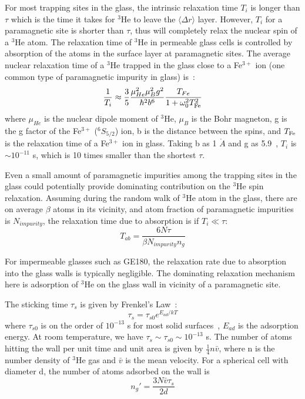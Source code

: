 For most trapping sites in the glass, the intrinsic relaxation time $T_{i}$ is longer than $\tau$ which is the time it takes for $^{3}$He to leave the $\langle\Delta r\rangle$ layer. However, $T_{i}$ for a paramagnetic site is shorter than $\tau$, thus will completely relax the nuclear spin of a $^{3}$He atom. The relaxation time of $^{3}$He in permeable glass cells is controlled by absorption of the atoms in the surface layer at paramagnetic sites. The average nuclear relaxation time of a $^{3}$He trapped in the glass close to a Fe$^{3+}$ ion (one common type of paramagnetic impurity in glass) is~\cite{Abragam}:
\begin{equation}
\frac{1}{T_i}\approx\frac{3}{5}\frac{\mu_{He}^{2}\mu_{B}^{2}g^2}
{\hbar^2b^6}\frac{T_{Fe}}{1+\omega_0^2T_{{\rm Fe}}^2}
\end{equation}
where $\mu_{He}$ is the nuclear dipole moment of $^{3}$He, $\mu_B$ is the Bohr magneton, g is the g factor of the Fe$^{3+}$ ($^{6}S_{5/2}$) ion, b is the distance between the spins, and $T_{{\rm Fe}}$ is the relaxation time of a Fe$^{3+}$ ion in glass. Taking b as 1 $\mathring{A}$ and g as 5.9~\cite{Kittle}, $T_i$ is $\sim10^{-11}$ s, which is 10 times smaller than the shortest $\tau$.

Even a small amount of paramagnetic impurities among the trapping sites in the glass could potentially provide dominating contribution on the $^{3}$He spin relaxation. Assuming during the random walk of $^{3}$He atom in the glass, there are on average $\beta$ atoms in its vicinity, and atom fraction of paramagnetic impurities is $N_{impurity}$, the relaxation time due to absorption is if $T_i\ll\tau$:
\begin{equation}\label{T_ab}
T_{ab}=\frac{6N\tau}{\beta N_{impurity}n_g}
\end{equation}

For impermeable glasses such as GE180, the relaxation rate due to absorption into the glass walls is typically negligible. The dominating relaxation mechanism here is adsorption of $^{3}$He on the glass wall in vicinity of a paramagnetic site.

The sticking time $\tau_s$ is given by Frenkel's Law~\cite{Frenkel}:
\begin{equation}\label{sticking_time}
\tau_s=\tau_{s0}e^{E_{ad}/kT}
\end{equation}
where $\tau_{s0}$ is on the order of $10^{-13}$ s for most solid surfaces~\cite{Frenkel}, $E_{ad}$ is the adsorption energy. At room temperature, we have $\tau_s\sim\tau_{s0}\sim 10^{-13}$ s. The number of atoms hitting the wall per unit time and unit area is given by $\frac{1}{4}n\bar{v}$, where n is the number density of $^{3}$He gas and $\bar{v}$ is the mean velocity. For a spherical cell with diameter d, the number of atoms adsorbed on the wall is
\begin{equation}\label{adsorption_ng}
n_{g}'=\frac{3N\bar{v}\tau_s}{2d}
\end{equation}

